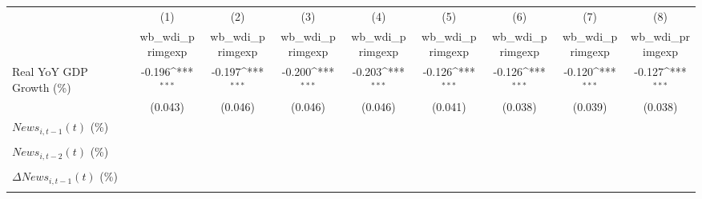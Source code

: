 {
\def\sym#1{\ifmmode^{#1}\else\(^{#1}\)\fi}
\begin{tabular}{l*{8}{c}}
\toprule
                    &\multicolumn{1}{c}{(1)}&\multicolumn{1}{c}{(2)}&\multicolumn{1}{c}{(3)}&\multicolumn{1}{c}{(4)}&\multicolumn{1}{c}{(5)}&\multicolumn{1}{c}{(6)}&\multicolumn{1}{c}{(7)}&\multicolumn{1}{c}{(8)}\\
                    &\multicolumn{1}{c}{wb_wdi_primgexp}&\multicolumn{1}{c}{wb_wdi_primgexp}&\multicolumn{1}{c}{wb_wdi_primgexp}&\multicolumn{1}{c}{wb_wdi_primgexp}&\multicolumn{1}{c}{wb_wdi_primgexp}&\multicolumn{1}{c}{wb_wdi_primgexp}&\multicolumn{1}{c}{wb_wdi_primgexp}&\multicolumn{1}{c}{wb_wdi_primgexp}\\
\midrule
Real YoY GDP Growth (\%)&      -0.196\sym{***}&      -0.197\sym{***}&      -0.200\sym{***}&      -0.203\sym{***}&      -0.126\sym{***}&      -0.126\sym{***}&      -0.120\sym{***}&      -0.127\sym{***}\\
                    &     (0.043)         &     (0.046)         &     (0.046)         &     (0.046)         &     (0.041)         &     (0.038)         &     (0.039)         &     (0.038)         \\
\addlinespace
$ News_{i,t-1}(t)$ (\%)&                     &                     &                     &                     &                     &                     &                     &                     \\
                    &                     &                     &                     &                     &                     &                     &                     &                     \\
\addlinespace
$ News_{i,t-2}(t)$ (\%)&                     &                     &                     &                     &                     &                     &                     &                     \\
                    &                     &                     &                     &                     &                     &                     &                     &                     \\
\addlinespace
$ \Delta News_{i,t-1}(t)$ (\%)&                     &                     &                     &                     &                     &                     &                     &                     \\
                    &                     &                     &                     &                     &                     &                     &                     &                     \\

\end{tabular}}
